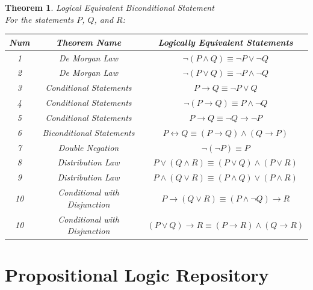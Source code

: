 \documentclass{book}
\newtheorem{theorem}{Theorem}[section]
\theoremstyle{definition}
\theoremstyle{remark}
\begin{document}
\begin{tcolorbox}
\begin{theorem}
Logical Equivalent Biconditional Statement \\
For the statements $P$, $Q$, and $R$: \\
\begin{tabular}{|c|c|c|}
\hline 
Num & Theorem Name & Logically Equivalent Statements \\ 
\hline 
1 & De Morgan Law & $\neg(P \wedge Q) \equiv \neg P \vee \neg Q$ \\ 
\hline 
2 & De Morgan Law & $\neg(P \vee Q) \equiv \neg P \wedge \neg Q$ \\ 
\hline 
3 & Conditional Statements  & $P \to Q \equiv \neg P \vee Q$ \\ 
\hline 
4 & Conditional Statements & $\neg (P \to Q) \equiv P \wedge \neg Q$ \\ 
\hline 
5 & Conditional Statements & $P \to Q \equiv \neg Q \to \neg P$ \\ 
\hline 
6 & Biconditional Statements & $P \leftrightarrow Q \equiv (P \to Q) \wedge (Q \to P)$ \\ 
\hline 
7 & Double Negation & $\neg(\neg P) \equiv P$ \\ 
\hline 
8 & Distribution Law & $P \vee (Q \wedge R) \equiv (P \vee Q) \wedge (P \vee R)$ \\ 
\hline 
9 & Distribution Law & $P \wedge (Q \vee R) \equiv (P \wedge Q) \vee (P \wedge R)$ \\ 
\hline 
10 & Conditional with Disjunction & $P \to (Q \vee R) \equiv (P \wedge \neg Q) \to R$ \\ 
\hline 
10 & Conditional with Disjunction & $(P \vee Q) \to R \equiv (P \to R) \wedge (Q \to R)$ \\ 
\hline 
\end{tabular} 
\end{theorem}
\end{tcolorbox}


\newpage
\section{Propositional Logic Repository} 
\end{document}
